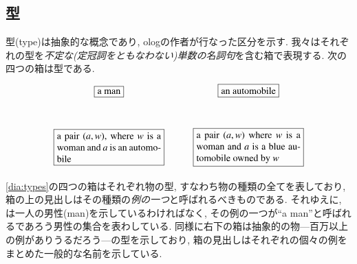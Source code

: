 
\subsection{型}


型(type)は抽象的な概念であり, ologの作者が行なった区分を示す. 我々はそれぞれの型を\emph{不定な(定冠詞をともなわない)単数の名詞句}を含む箱で表現する. 次の四つの箱は型である. \begin{align}\label{dia:types}\xymatrixnocompile{\fbox{a man}&\fbox{an automobile}\\\obox{}{1.5in}{a pair $(a,w)$, where $w$ is a woman and $a$ is an automobile}&\obox{}{1.5in}{a pair $(a,w)$ where $w$ is a woman and $a$ is a blue automobile owned by $w$}}\end{align}


\eqref{dia:types}の四つの箱はそれぞれ物の型, すなわち物の種類の全てを表しており, 箱の上の見出しはその種類の\emph{例の一つ}と呼ばれるべきものである. それゆえに, は一人の男性(man)を示しているわければなく, その例の一つが``a man''と呼ばれるであろう男性の集合を表わしている. 同様に右下の箱は抽象的の物---百万以上の例がありうるだろう---の型を示しており, 箱の見出しはそれぞれの個々の例をまとめた一般的な名前を示している.

